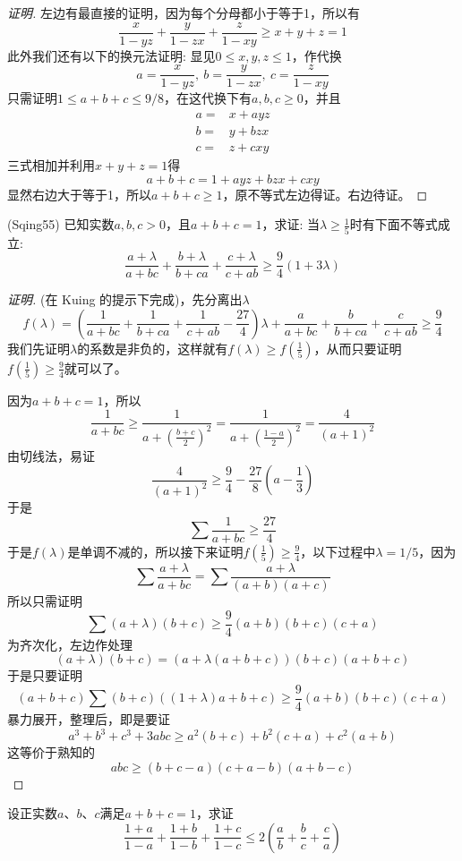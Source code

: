 \exerciseFrom[2017年德国数学奥林匹克试题\\
\url{http://kuing.orzweb.net/viewthread.php?tid=4578}]

\begin{proof}[证明]
  左边有最直接的证明，因为每个分母都小于等于1，所以有
  \[ \frac{x}{1-yz}+\frac{y}{1-zx}+\frac{z}{1-xy} \geqslant x+y+z = 1 \]
  此外我们还有以下的换元法证明:
  显见$0 \leqslant x,y,z \leqslant 1$，作代换
  \[ a=\frac{x}{1-yz}, \  b=\frac{y}{1-zx}, \  c=\frac{z}{1-xy} \]
  只需证明$1\leqslant a+b+c \leqslant 9/8$，在这代换下有$a,b,c \geqslant 0$，并且
  \begin{align*}
    a = {} & x+ayz \\
    b = {} & y+bzx \\
    c = {} & z+cxy
  \end{align*}
  三式相加并利用$x+y+z=1$得
  \[ a+b+c=1+ayz+bzx+cxy \]
  显然右边大于等于1，所以$a+b+c\geqslant 1$，原不等式左边得证。右边待证。
\end{proof}

\begin{exercise}
  (Sqing55) 已知实数$a,b,c>0$，且$a+b+c=1$，求证: 当$\lambda \geqslant \frac{1}{5}$时有下面不等式成立:
  \[ \frac{a+\lambda}{a+bc} + \frac{b+\lambda}{b+ca} + \frac{c+\lambda}{c+ab} \geqslant \frac{9}{4}(1+3\lambda) \]
  \begin{proof}[证明]
    (在 Kuing 的提示下完成)，先分离出$\lambda$
    \[ f(\lambda) = \left( \frac{1}{a+bc}+\frac{1}{b+ca}+\frac{1}{c+ab}-\frac{27}{4} \right) \lambda + \frac{a}{a+bc}+\frac{b}{b+ca}+\frac{c}{c+ab} \geqslant \frac{9}{4} \]
    我们先证明$\lambda$的系数是非负的，这样就有$f(\lambda)\geqslant f\left( \frac{1}{5} \right)$，从而只要证明$f\left( \frac{1}{5} \right) \geqslant \frac{9}{4}$就可以了。

    因为$a+b+c=1$，所以
    \[ \frac{1}{a+bc} \geqslant \frac{1}{a+\left( \frac{b+c}{2} \right)^2} =
    \frac{1}{a+\left( \frac{1-a}{2} \right)^2} = \frac{4}{(a+1)^2} \]
  由切线法，易证
  \[ \frac{4}{(a+1)^2} \geqslant \frac{9}{4}-\frac{27}{8}\left( a-\frac{1}{3} \right) \]
  于是
  \[ \sum \frac{1}{a+bc} \geqslant \frac{27}{4} \]
  于是$f(\lambda)$是单调不减的，所以接下来证明$f\left( \frac{1}{5} \right) \geqslant \frac{9}{4}$，以下过程中$\lambda=1/5$，因为
  \[ \sum \frac{a+\lambda}{a+bc} = \sum \frac{a+\lambda}{(a+b)(a+c)} \]
  所以只需证明
  \[ \sum (a+\lambda)(b+c) \geqslant \frac{9}{4}(a+b)(b+c)(c+a) \]
  为齐次化，左边作处理
  \[ (a+\lambda)(b+c) = (a+\lambda(a+b+c))(b+c)(a+b+c) \]
  于是只要证明
  \[ (a+b+c)\sum (b+c)((1+\lambda)a+b+c) \geqslant \frac{9}{4}(a+b)(b+c)(c+a) \]
  暴力展开，整理后，即是要证
  \[ a^3+b^3+c^3 +3abc \geqslant a^2(b+c) + b^2(c+a)+c^2(a+b) \]
  这等价于熟知的
  \[ abc \geqslant (b+c-a)(c+a-b)(a+b-c) \]
  \end{proof}
\end{exercise}

\begin{exercise}
  设正实数$a$、$b$、$c$满足$a+b+c=1$，求证
  \[ \frac{1+a}{1-a} + \frac{1+b}{1-b} + \frac{1+c}{1-c} \leqslant 2 \left( \frac{a}{b} + \frac{b}{c} + \frac{c}{a} \right) \]
\end{exercise}



